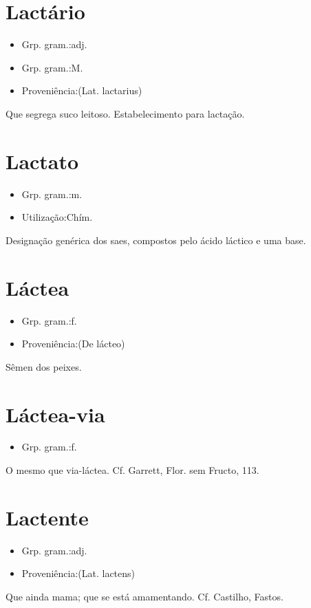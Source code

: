 \section{Lactário}
\begin{itemize}
\item {Grp. gram.:adj.}
\end{itemize}
\begin{itemize}
\item {Grp. gram.:M.}
\end{itemize}
\begin{itemize}
\item {Proveniência:(Lat. \textunderscore lactarius\textunderscore )}
\end{itemize}
Que segrega suco leitoso.
Estabelecimento para lactação.
\section{Lactato}
\begin{itemize}
\item {Grp. gram.:m.}
\end{itemize}
\begin{itemize}
\item {Utilização:Chím.}
\end{itemize}
Designação genérica dos saes, compostos pelo ácido láctico e uma base.
\section{Láctea}
\begin{itemize}
\item {Grp. gram.:f.}
\end{itemize}
\begin{itemize}
\item {Proveniência:(De \textunderscore lácteo\textunderscore )}
\end{itemize}
Sêmen dos peixes.
\section{Láctea-via}
\begin{itemize}
\item {Grp. gram.:f.}
\end{itemize}
O mesmo que \textunderscore via-láctea\textunderscore . Cf. Garrett, \textunderscore Flor. sem Fructo\textunderscore , 113.
\section{Lactente}
\begin{itemize}
\item {Grp. gram.:adj.}
\end{itemize}
\begin{itemize}
\item {Proveniência:(Lat. \textunderscore lactens\textunderscore )}
\end{itemize}
Que ainda mama; que se está amamentando. Cf. Castilho, \textunderscore Fastos\textunderscore .
